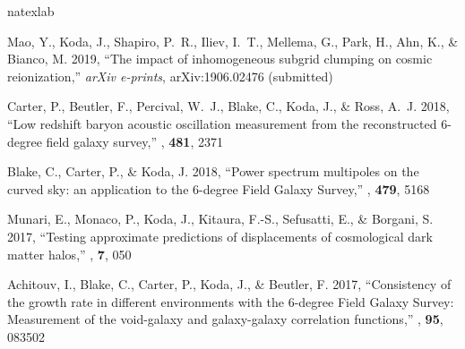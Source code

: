 
\renewcommand{\section}[2]{\vspace{2\baselineskip}\refstepcounter{section}{\bf \textsf{#2}}\vspace{0.25\baselineskip}}
\renewcommand{\refname}{Refereed Publications}
\begin{thebibliography}{8}
\expandafter\ifx\csname natexlab\endcsname\relax\def\natexlab#1{#1}\fi

{Mao}, Y., {Koda}, J., {Shapiro}, P.~R., {Iliev}, I.~T., {Mellema}, G., {Park},
  H., {Ahn}, K., \& {Bianco}, M. 2019, ``{The impact of inhomogeneous subgrid
  clumping on cosmic reionization},'' {\em arXiv e-prints\/}, arXiv:1906.02476 (submitted)

{Carter}, P., {Beutler}, F., {Percival}, W.~J., {Blake}, C., {Koda}, J., \&
  {Ross}, A.~J. 2018, ``{Low redshift baryon acoustic oscillation measurement
  from the reconstructed 6-degree field galaxy survey},'' {\em \mnras\/}, {\bf
  481}, 2371

{Blake}, C., {Carter}, P., \& {Koda}, J. 2018, ``{Power spectrum multipoles on
  the curved sky: an application to the 6-degree Field Galaxy Survey},'' {\em
  \mnras\/}, {\bf 479}, 5168

{Munari}, E., {Monaco}, P., {Koda}, J., {Kitaura}, F.-S., {Sefusatti}, E., \&
  {Borgani}, S. 2017, ``{Testing approximate predictions of displacements of
  cosmological dark matter halos},'' {\em \jcap\/}, {\bf 7}, 050

{Achitouv}, I., {Blake}, C., {Carter}, P., {Koda}, J., \& {Beutler}, F. 2017,
  ``{Consistency of the growth rate in different environments with the 6-degree
  Field Galaxy Survey: Measurement of the void-galaxy and galaxy-galaxy
  correlation functions},'' {\em \prd\/}, {\bf 95}, 083502


\end{thebibliography}
